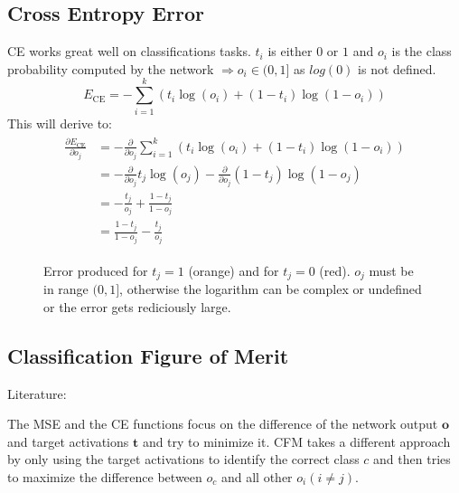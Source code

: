 \subsection{Cross Entropy Error}\label{sec:ce}
\Gls{CE} works great well on classifications tasks. $t_i$ is either $0$ or $1$ and $o_i$ is the class probability computed by the network $\Rightarrow o_i \in (0, 1]$ as $log(0)$ is not defined.
\begin{equation}\label{eq:ce}
E_{\text{CE}} = - \sum_{i=1}^k \left( t_i \log(o_i) + (1 - t_i) \log(1 - o_i) \right)
\end{equation}
This will derive to:
\begin{align}
\begin{split}
\frac{\partial E_{\text{CE}}}{\partial o_j} &= - \frac{\partial}{\partial o_j} \sum_{i=1}^k \left( t_i \log(o_i) + (1 - t_i) \log(1 - o_i) \right)\\
&= - \frac{\partial}{\partial o_j} t_j \log(o_j) - \frac{\partial}{\partial o_j} (1 - t_j) \log(1 - o_j)\\
&= - \frac{t_j}{o_j} + \frac{1 - t_j}{1 - o_j}\\
&= \frac{1 - t_j}{1 - o_j} - \frac{t_j}{o_j}
\end{split}
\end{align}

\begin{figure}
\centering
{}
\caption{Error produced for $t_j=1$ (orange) and for $t_j=0$ (red). $o_j$ must be in range $(0,1]$, otherwise the logarithm can be complex or undefined or the error gets rediciously large.}
\end{figure}

\subsection{Classification Figure of Merit}\label{cfm}
Literature: \cite{Hampshire1990}

The \gls{MSE} and the \gls{CE} functions focus on the difference of the network output $\mathbf{o}$ and target activations $\mathbf{t}$ and try to minimize it. \Gls{CFM} takes a different approach by only using the target activations to identify the correct class $c$ and then tries to maximize the difference between $o_c$ and all other $o_i (i\neq j)$.

